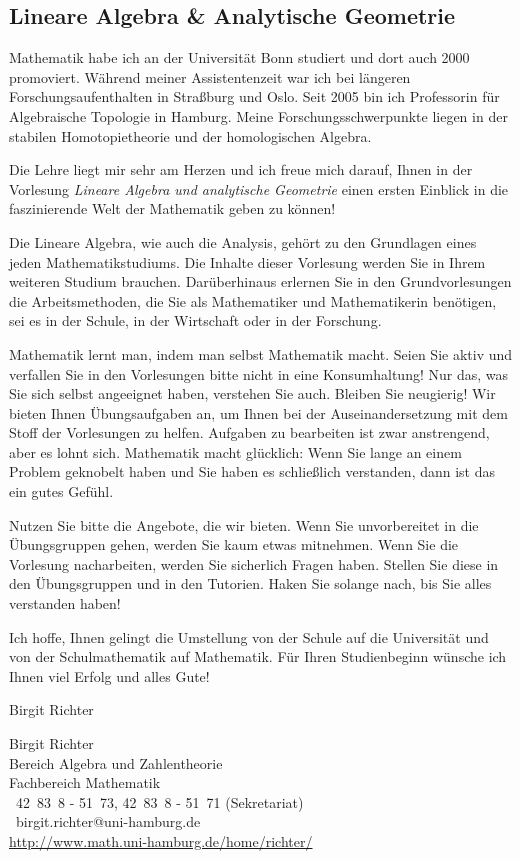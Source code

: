 
\subsection{Lineare Algebra \& Analytische Geometrie}

Mathematik habe ich an der Universit\"at Bonn studiert und dort auch 2000
promoviert. W\"ahrend meiner Assistentenzeit war ich bei l\"angeren
Forschungsaufent\-halten in Stra{\ss}burg und Oslo. Seit 2005 bin ich
Professorin f\"ur Algebraische Topologie in Hamburg. Meine
Forschungsschwerpunkte liegen in der stabilen Homoto\-pie\-theorie und der
homologischen Algebra.

\phantom{Die Lehre liegt mir sehr am Herzen und ich freue mich darauf, Ihnen in der}
Die Lehre liegt mir sehr am Herzen und ich freue mich darauf, Ihnen in der
Vorlesung \emph{Lineare Algebra und analytische Geometrie} einen ersten
Einblick in die faszinierende Welt der Mathematik geben zu k\"onnen!

Die Lineare Algebra, wie auch die Analysis, geh\"ort zu den Grundlagen eines
jeden Mathematikstudiums. Die Inhalte dieser Vorlesung werden Sie in Ihrem
weiteren Studium brauchen. Dar\"uberhinaus erlernen Sie in den Grundvorlesungen
die Arbeitsmethoden, die Sie als Mathematiker und Mathematikerin ben\"otigen,
sei es in der Schule, in der Wirtschaft oder in der Forschung. 

Mathematik lernt man, indem man selbst Mathematik macht. Seien Sie aktiv und
verfallen Sie in den Vorlesungen bitte nicht in eine Konsumhaltung!  Nur das,
was Sie sich selbst angeeignet haben, verstehen Sie auch. Bleiben Sie
neugierig! Wir bieten Ihnen \"Ubungsaufgaben an, um Ihnen bei der
Auseinandersetzung mit dem Stoff der Vorlesungen zu helfen. Aufgaben zu
bearbeiten ist zwar anstrengend, aber es lohnt sich.  Mathematik macht
gl\"ucklich: Wenn Sie lange an einem Problem geknobelt haben und Sie haben es
schlie{\ss}lich verstanden, dann ist das ein gutes Gef\"uhl. 

Nutzen Sie bitte die Angebote, die wir bieten. Wenn Sie unvorbereitet in die
\"Ubungsgruppen gehen, werden Sie kaum etwas mitnehmen. Wenn Sie die Vorlesung
nacharbeiten, werden Sie sicherlich Fragen haben. Stellen Sie diese in den
\"Ubungsgruppen und in den Tutorien. Haken Sie solange nach, bis Sie alles
verstanden haben! 

Ich hoffe, Ihnen gelingt die Umstellung von der Schule auf die Universit\"at
und von der Schulmathematik auf Mathematik.   F\"ur Ihren Studienbeginn
w\"unsche ich Ihnen viel Erfolg und alles Gute!

\bigskip

\hfill Birgit Richter

Birgit Richter \\
Bereich Algebra und Zahlentheorie\\
Fachbereich Mathematik\\
\Telefon\ 42~83~8 - 51~73, 42~83~8 - 51~71 (Sekretariat) \\
\Letter\ birgit.richter@uni-hamburg.de\\
\url{http://www.math.uni-hamburg.de/home/richter/}
